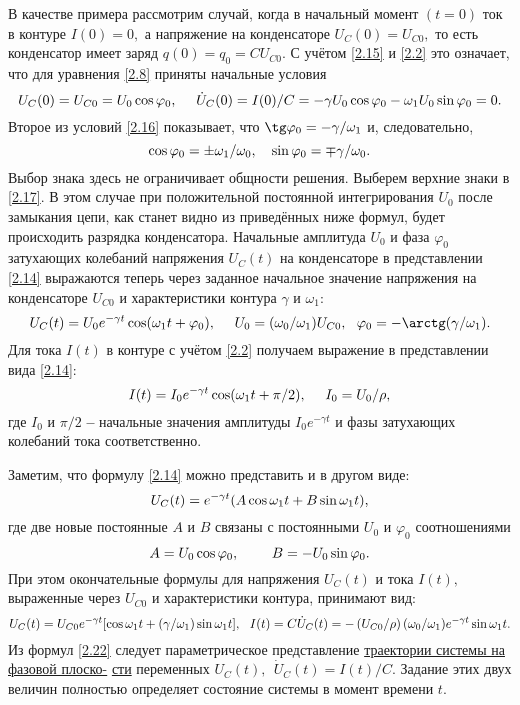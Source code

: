 В качестве примера рассмотрим случай, когда в начальный момент $(t=0)$ ток в контуре $I(0)=0,$ а напряжение на конденсаторе $U_C(0)=U_{C0},$ то есть конденсатор имеет заряд $q(0)=q_0=CU_{C0}.$ С учётом \eqref{2.15} и \eqref{2.2} это означает, что для уравнения \eqref{2.8} приняты начальные условия
{\large
\begin{equation}\eqmark{2.16}
U_C(0)=U_{C0}=U_0\cos\varphi_0,~~~~\dot{U}_C(0)=I(0)/C=-\gamma U_0\cos\varphi_0-\omega_1U_0\sin\varphi_0=0.
\end{equation}}
Второе из условий \eqref{2.16} показывает, что $\tg\varphi_0=-\gamma/\omega_1$ и, следовательно,
\begin{equation}\eqmark{2.17}
\cos\varphi_0=\pm\omega_1/\omega_0,~~~\sin\varphi_0=\mp\gamma/\omega_0.
\end{equation}
Выбор знака здесь не ограничивает общности решения. Выберем верхние знаки в \eqref{2.17}. В этом случае при положительной постоянной интегрирования $U_0$ после замыкания цепи, как станет видно из приведённых ниже формул, будет происходить разрядка конденсатора. Начальные амплитуда $U_0$ и фаза $\varphi_0$ затухающих колебаний напряжения $U_C(t)$ на конденсаторе в представлении \eqref{2.14} выражаются теперь через заданное начальное значение напряжения на конденсаторе $U_{C0}$ и характеристики контура $\gamma$ и $\omega_1:$
\begin{equation}\eqmark{2.18}
U_C(t)=U_0e^{-\gamma t}\cos(\omega_1t+\varphi_0),~~~~U_0=(\omega_0/\omega_1)U_{C0},~~\varphi_0=-\arctg(\gamma/\omega_1).
\end{equation}
Для тока $I(t)$ в контуре с учётом \eqref{2.2} получаем выражение в представлении вида \eqref{2.14}:
\begin{equation}\eqmark{2.19}
I(t)=I_0e^{-\gamma t}\cos(\omega_1t+\pi/2),~~~~I_0=U_0/\rho,
\end{equation}
где $I_0$ и $\pi/2$ \textbf{--} начальные значения амплитуды $I_0e^{-\gamma t}$ и фазы затухающих колебаний тока соответственно.

Заметим, что формулу \eqref{2.14} можно представить и в другом виде:			
\begin{equation}\eqmark{2.20}
U_C(t)=e^{-\gamma t}(A\cos\omega_1 t+B\sin\omega_1 t),
\end{equation}
где две новые постоянные $A$ и $B$ связаны с постоянными $U_0$ и $\varphi_0$ соотношениями
\begin{equation}\eqmark{2.21}
A=U_0\cos\varphi_0,~~~~~~~B=-U_0\sin\varphi_0.
\end{equation}
При этом окончательные формулы для напряжения $U_C(t)$ и тока $I(t),$ выраженные через $U_{C0}$ и характеристики контура, принимают вид:
{\large
\begin{equation}\eqmark{2.22}
U_C(t)=U_{C0}e^{-\gamma t}[\cos\omega_1t+(\gamma/\omega_1)\sin\omega_1t],~~I(t)=C\dot{U}_C(t)
=-\left(U_{C0}/\rho\right)(\omega_0/\omega_1)e^{-\gamma t}\sin\omega_1t.\\
\end{equation}}
Из формул \eqref{2.22} следует параметрическое представление \underline{траектории системы на фазовой плоско-} \underline{сти} переменных $U_C(t),~~\dot{U}_C(t)=I(t)/C.$ Задание этих двух величин полностью определяет состояние системы в момент времени $t.$

